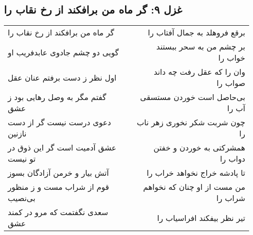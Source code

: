 \begin{center}
\section*{غزل ۹: گر ماه من برافکند از رخ نقاب را}
\label{sec:009}
\begin{longtable}{l p{0.5cm} r}
گر ماه من برافکند از رخ نقاب را
&&
برقع فروهلد به جمال آفتاب را
\\
گویی دو چشم جادوی عابدفریب او
&&
بر چشم من به سحر ببستند خواب را
\\
اول نظر ز دست برفتم عنان عقل
&&
وان را که عقل رفت چه داند صواب را
\\
گفتم مگر به وصل رهایی بود ز عشق
&&
بی‌حاصل است خوردن مستسقی آب را
\\
دعوی درست نیست گر از دست نازنین
&&
چون شربت شکر نخوری زهر ناب را
\\
عشق آدمیت است گر این ذوق در تو نیست
&&
همشرکتی به خوردن و خفتن دواب را
\\
آتش بیار و خرمن آزادگان بسوز
&&
تا پادشه خراج نخواهد خراب را
\\
قوم از شراب مست و ز منظور بی‌نصیب
&&
من مست از او چنان که نخواهم شراب را
\\
سعدی نگفتمت که مرو در کمند عشق
&&
تیر نظر بیفکند افراسیاب را
\\
\end{longtable}
\end{center}
